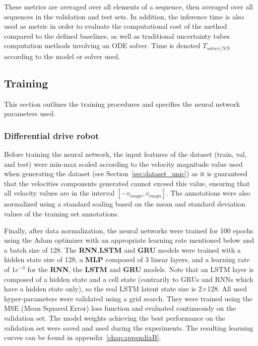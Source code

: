 These metrics are averaged over all elements of a sequence, then averaged over all sequences in the validation and test sets. 
In addition, the inference time is also used as metric in order to evaluate the computational cost of the method compared to the defined baselines, as well as traditional uncertainty tubes computation methods involving an ODE solver. 
Time is denoted $T_{solver/NN}$ according to the model or solver used.

\subsection{Training}

This section outlines the training procedures and specifies the neural network parameters used.

\subsubsection{Differential drive robot}

Before training the neural network, the input features of the dataset (train, val, and test) were min-max scaled according to the velocity magnitude value used when generating the dataset (see Section~\ref{sec:dataset_unic}) as it is guaranteed that the velocities components generated cannot exceed this value, ensuring that all velocity values are in the interval $[-v_{magn}, v_{magn}]$.  
The annotations were also normalized using a standard scaling based on the mean and standard deviation values of the training set annotations.

Finally, after data normalization, the neural networks were trained for 100 epochs using the Adam optimizer \cite{kingma2014adam} with an appropriate learning rate mentioned below and a batch size of 128. 
The \textbf{RNN},\textbf{LSTM} and \textbf{GRU} models were trained with a hidden state size of 128, a \textbf{MLP} composed of 3 linear layers, and a learning rate of $1e^{-3}$ for the \textbf{RNN}, the \textbf{LSTM} and \textbf{GRU} models.
Note that an LSTM layer is composed of a hidden state and a cell state (contrarily to GRUs and RNNs which have a hidden state only), so the real LSTM latent state size is 2$\times$128.
All used hyper-parameters were validated using a grid search.
They were trained using the MSE (Mean Squared Error) loss function and evaluated continuously on the validation set. 
The model weights achieving the best performance on the validation set were saved and used during the experiments.
The resulting learning curves can be found in appendix~\ref{chap:appendixB}.

